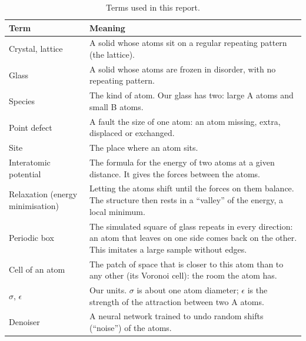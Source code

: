 \documentclass[10pt]{article}
\begin{document}
\begin{table}[t]
\centering
\caption{Terms used in this report.}
\label{tab:terms}
\small
\begin{tabularx}{\linewidth}{@{}>{\raggedright\arraybackslash}p{1.35in}>{\raggedright\arraybackslash}X@{}}
\toprule
Term & Meaning \\
\midrule
Crystal, lattice & A solid whose atoms sit on a regular repeating pattern (the lattice). \\
Glass & A solid whose atoms are frozen in disorder, with no repeating pattern. \\
Species & The kind of atom. Our glass has two: large A atoms and small B atoms. \\
Point defect & A fault the size of one atom: an atom missing, extra, displaced or exchanged. \\
Site & The place where an atom sits. \\
Interatomic potential & The formula for the energy of two atoms at a given distance. It gives the forces between the atoms. \\
Relaxation (energy minimisation) & Letting the atoms shift until the forces on them balance. The structure then rests in a ``valley'' of the energy, a local minimum. \\
Periodic box & The simulated square of glass repeats in every direction: an atom that leaves on one side comes back on the other. This imitates a large sample without edges. \\
Cell of an atom & The patch of space that is closer to this atom than to any other (its Voronoi cell): the room the atom has. \\
$\sigma$, $\epsilon$ & Our units. $\sigma$ is about one atom diameter; $\epsilon$ is the strength of the attraction between two A atoms. \\
Denoiser & A neural network trained to undo random shifts (``noise'') of the atoms. \\
\bottomrule
\end{tabularx}
\end{table}
\end{document}
